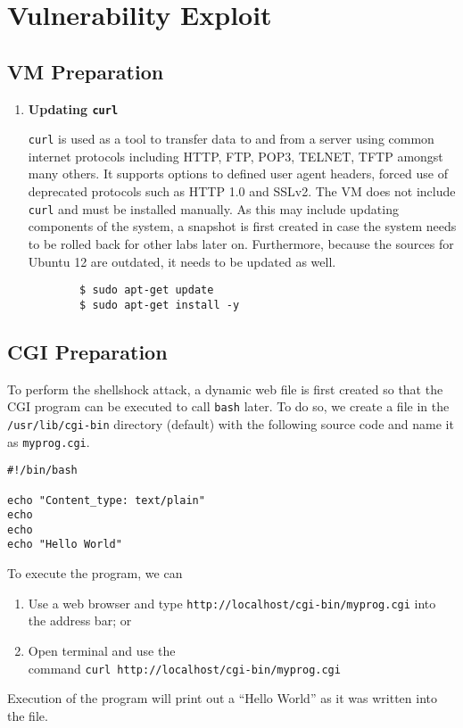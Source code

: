 \documentclass[a4paper,12pt]{article}
\begin{document}
\section{Vulnerability Exploit}
\subsection{VM Preparation}
\vspace{1em}
\begin{enumerate}
	\item \textbf{Updating \texttt{curl}}
	\begin{par}\texttt{curl} is used as a tool to transfer data to and from a server using common internet protocols including HTTP, FTP, POP3, TELNET, TFTP amongst many others. It supports options to defined user agent headers, forced use of deprecated protocols such as HTTP 1.0 and SSLv2. The VM does not include \texttt{curl} and must be installed manually. As this may include updating components of the system, a snapshot is first created in case the system needs to be rolled back for other labs later on. Furthermore, because the sources for Ubuntu 12 are outdated, it needs to be updated as well.
		\begin{verbatim}
		$ sudo apt-get update
		$ sudo apt-get install -y
		\end{verbatim}
	\end{par}
	\end{enumerate}

\subsection{CGI Preparation}
To perform the shellshock attack, a dynamic web file is first created so that the CGI program can be executed to call \texttt{bash} later. To do so, we create a file in the \texttt{/usr/lib/cgi-bin} directory (default) with the following source code and name it as \texttt{myprog.cgi}.
\begin{verbatim}
#!/bin/bash

echo "Content_type: text/plain"
echo
echo
echo "Hello World"
\end{verbatim}
To execute the program, we can
\begin{enumerate}
	\item Use a web browser and type \texttt{http://localhost/cgi-bin/myprog.cgi} into the address bar; or
	\item Open terminal and use the \\command \texttt{curl http://localhost/cgi-bin/myprog.cgi}
\end{enumerate}
Execution of the program will print out a ``Hello World'' as it was written into the file.
\newpage
\end{document}
